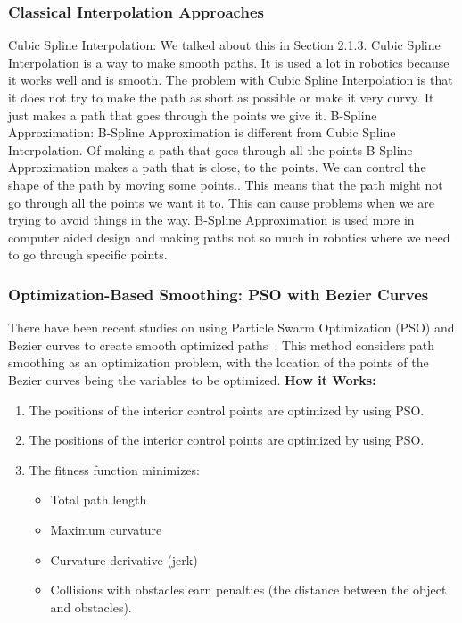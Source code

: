 \subsubsection{Classical Interpolation Approaches}

Cubic Spline Interpolation: We talked about this in Section 2.1.3. Cubic Spline Interpolation is a way to make smooth paths. It is used a lot in robotics because it works well and is smooth. The problem with Cubic Spline Interpolation is that it does not try to make the path as short as possible or make it very curvy. It just makes a path that goes through the points we give it.
B-Spline Approximation: B-Spline Approximation is different from Cubic Spline Interpolation. Of making a path that goes through all the points B-Spline Approximation makes a path that is close, to the points. We can control the shape of the path by moving some points.. This means that the path might not go through all the points we want it to. This can cause problems when we are trying to avoid things in the way. B-Spline Approximation is used more in computer aided design and making paths not so much in robotics where we need to go through specific points.~\cite{ravankar2018path,mercy2017spline}

\subsubsection{Optimization-Based Smoothing: PSO with Bezier Curves}

There have been recent studies on using Particle Swarm Optimization (PSO) and Bezier curves to create smooth optimized paths~\cite{song2020smooth}. This method considers path smoothing as an optimization problem, with the location of the points of the Bezier curves being the variables to be optimized.
\textbf{How it Works:}

\begin{enumerate}[noitemsep]
\item The positions of the interior control points are optimized by using PSO.
\item The positions of the interior control points are optimized by using PSO.
\item The fitness function minimizes:
\begin{itemize}[noitemsep]
\item Total path length
\item Maximum curvature
\item Curvature derivative (jerk)
\item Collisions with obstacles earn penalties (the distance between the object and obstacles).
\end{itemize}
\end{enumerate}

